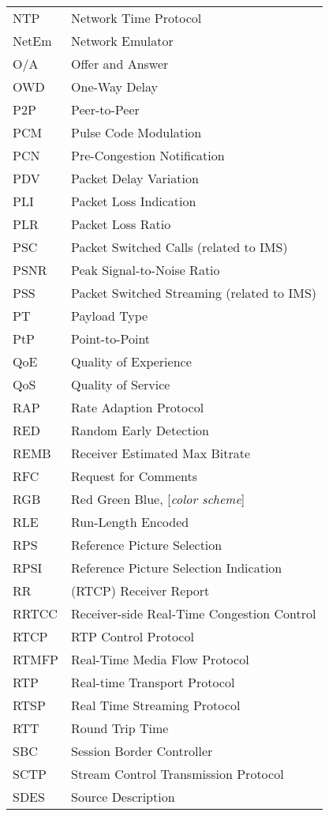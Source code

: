 \begin{longtable}{ll}
NTP  	& Network Time Protocol \\
NetEm 	& Network Emulator \\
O/A  	& Offer and Answer \\
OWD 	& One-Way Delay \\
P2P 	& Peer-to-Peer \\
PCM 	& Pulse Code Modulation \\
PCN 	& Pre-Congestion Notification \\
PDV 	& Packet Delay Variation \\
PLI 	& Packet Loss Indication \\
PLR 	& Packet Loss Ratio \\
PSC 	& Packet Switched Calls (related to IMS)\\
PSNR	& Peak Signal-to-Noise Ratio \\
PSS 	& Packet Switched Streaming (related to IMS)\\
PT  	& Payload Type \\
PtP 	& Point-to-Point \\
QoE 	& Quality of Experience \\
QoS 	& Quality of Service \\
RAP 	& Rate Adaption Protocol \\
RED 	& Random Early Detection \\
REMB 	& Receiver Estimated Max Bitrate \\
RFC 	& Request for Comments \\
RGB 	& Red Green Blue, [\textit{color scheme}] \\
RLE 	& Run-Length Encoded \\
RPS 	& Reference Picture Selection \\
RPSI 	& Reference Picture Selection Indication \\
RR  	& (RTCP) Receiver Report \\
RRTCC	& Receiver-side Real-Time Congestion Control \\
RTCP 	& RTP Control Protocol \\
RTMFP	& Real-Time Media Flow Protocol \\
RTP 	& Real-time Transport Protocol \\
RTSP 	& Real Time Streaming Protocol \\
RTT 	& Round Trip Time \\
SBC  	& Session Border Controller \\
SCTP 	& Stream Control Transmission Protocol \\
SDES 	& Source Description \\

\end{longtable}
